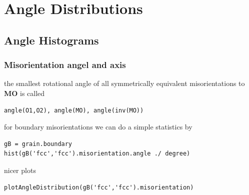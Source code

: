 \documentclass[compress]{beamer}
\begin{document}
\section{Angle Distributions}

\subsection*{Angle Histograms}

\begin{frame}[fragile]
  \frametitle{Misorientation angel and axis}

  \begin{overlayarea}{\textwidth}{0.55\textheight}

    the smallest rotational angle of all symmetrically equivalent
    misorientations to \textbf{MO} is called 
    \vspace{-.2cm}
    \begin{lstlisting}[style=input]
angle(O1,O2), angle(MO), angle(inv(MO))
    \end{lstlisting}

\pause

for boundary misorientations we can do a simple statistics by
\vspace{-.2cm}
    \begin{lstlisting}[style=input]
gB = grain.boundary
hist(gB('fcc','fcc').misorientation.angle ./ degree)
    \end{lstlisting}

    \pause

    nicer  plots
    \vspace{-.2cm}
    \begin{lstlisting}[style=input]
plotAngleDistribution(gB('fcc','fcc').misorientation)
    \end{lstlisting}



  \end{overlayarea}

  \begin{overlayarea}{\textwidth}{0.45\textheight}
    \centering
  \end{overlayarea}

\end{frame}
\end{document}
